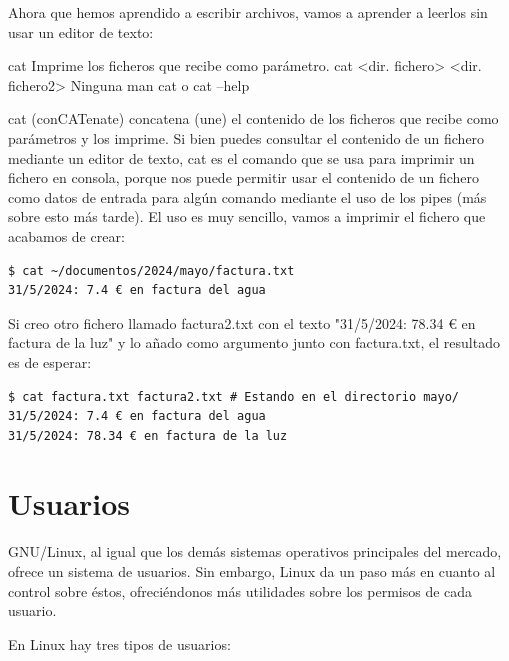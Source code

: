 Ahora que hemos aprendido a escribir archivos, vamos a aprender a leerlos sin usar un editor de texto:

\begin{command-info}
{cat}
{Imprime los ficheros que recibe como parámetro.}
{cat <dir. fichero> <dir. fichero2>}
{Ninguna}
{man cat o cat --help}
\end{command-info}

cat (conCATenate) concatena (une) el contenido de los ficheros que recibe como parámetros y los imprime. Si bien puedes consultar el contenido de un fichero mediante un editor de texto, cat es el comando que se usa para imprimir un fichero en consola, porque nos puede permitir usar el contenido de un fichero como datos de entrada para algún comando mediante el uso de los pipes (más sobre esto más tarde). El uso es muy sencillo, vamos a imprimir el fichero que acabamos de crear:

\begin{tcolorbox-code}
\begin{lstlisting}
$ cat ~/documentos/2024/mayo/factura.txt
31/5/2024: 7.4 € en factura del agua
\end{lstlisting}
\end{tcolorbox-code}

Si creo otro fichero llamado factura2.txt con el texto "31/5/2024: 78.34 € en factura de la luz" y lo añado como argumento junto con factura.txt, el resultado es de esperar:

\begin{tcolorbox-code}
\begin{lstlisting}
$ cat factura.txt factura2.txt # Estando en el directorio mayo/
31/5/2024: 7.4 € en factura del agua
31/5/2024: 78.34 € en factura de la luz
\end{lstlisting}
\end{tcolorbox-code}

\section{Usuarios}
GNU/Linux, al igual que los demás sistemas operativos principales del mercado, ofrece un sistema de usuarios. Sin embargo, Linux da un paso más en cuanto al control sobre éstos, ofreciéndonos más utilidades sobre los permisos de cada usuario.

En Linux hay tres tipos de usuarios:

